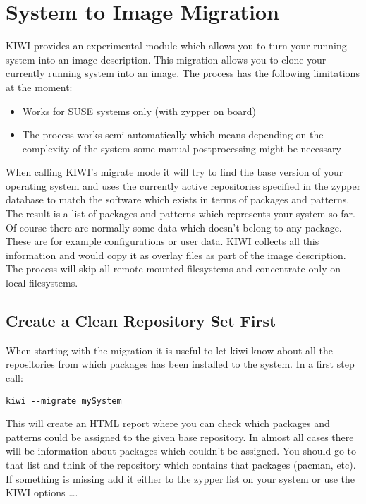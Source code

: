 \chapter{System to Image Migration}
\label{chapter:migration}
\minitoc

KIWI provides an experimental module which allows you to turn your
running system into an image description. This migration allows you
to clone your currently running system into an image. The process
has the following limitations at the moment:

\begin{itemize}
\item Works for SUSE systems only (with zypper on board)
\item The process works semi automatically which means depending
      on the complexity of the system some manual postprocessing might
      be necessary
\end{itemize}

When calling KIWI's migrate mode it will try to find the base version
of your operating system and uses the currently active repositories
specified in the zypper database to match the software which exists
in terms of packages and patterns. The result is a list of packages
and patterns which represents your system so far. Of course there are
normally some data which doesn't belong to any package. These are
for example configurations or user data. KIWI collects all this
information and would copy it as overlay files as part of the image
description. The process will skip all remote mounted filesystems
and concentrate only on local filesystems.

\section{Create a Clean Repository Set First}
When starting with the migration it is useful to let kiwi know about all
the repositories from which packages has been installed to 
the system. In a first step call:

\begin{Command}{12cm}
\begin{verbatim}
kiwi --migrate mySystem
\end{verbatim}
\end{Command}

This will create an HTML report where you can check which packages and
patterns could be assigned to the given base repository. In almost
all cases there will be information about packages which couldn't
be assigned. You should go to that list and think of the repository
which contains that packages (pacman, etc). If something is missing
add it either to the zypper list on your system or use the KIWI
options  \ldots {}.

